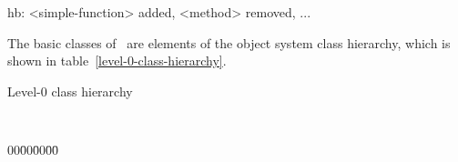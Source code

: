 \label{subsec:telos}
\label{subsec:objects}
%
\begin{optPrivate}
    hb: <simple-function> added, <method> removed, ...
\end{optPrivate}
%
\begin{optDefinition}
\noindent
The basic classes of \eulisp\ are elements of the object system class hierarchy,
which is shown in table~\ref{level-0-class-hierarchy}.
%
\begin{table}%
\caption{Level-0 class hierarchy}%
\label{level-0-class-hierarchy}%
{\tt%
\begin{tabbing}%
    00\=00\=00\=00\= \kill%
     \\
    \> \\
    \> \\
    \>\\
    \> \\
    \>\> \\
    \>\> \\
    \> \\
    \>\> \\
    \>\>\> \\
    \>\>\>\> \\
    \>\>\>\>\\
    \>\>\> \\
    \>\>\>\> \\
    \>\>\> \\
    \>\> \\
    \>\>\> \\
    \> \\
    \> \\
    \>\>\\
    \>\>\>\\
    \>\>\\
    \>\>\>\\
    \> \\

\end{tabbing}}
\end{table}
\end{optDefinition}
